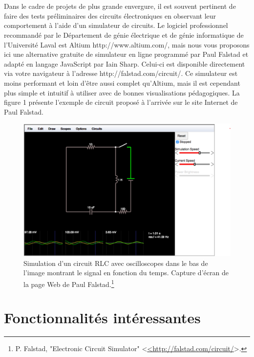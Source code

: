 \documentclass[12pt,oneside,letterpaper]{article}
\begin{document}
\title{}
\author{Claudine Allen \& Alicia Talbot-Lanciault}
\date{}
\maketitle



\section{}

Dans le cadre de projets de plus grande envergure, il est souvent pertinent de
faire des tests préliminaires des circuits électroniques en observant leur comportement
à l’aide d’un simulateur de circuits. Le logiciel professionnel recommandé par
le Département de génie électrique et de génie informatique de l’Université Laval
est Altium http://www.altium.com/, mais nous vous proposons ici une alternative
gratuite de simulateur en ligne programmé par Paul Falstad et adapté en langage
JavaScript par Iain Sharp. Celui-ci est disponible directement via votre navigateur
à l’adresse http://falstad.com/circuit/. Ce simulateur est moins performant et
loin d’être aussi complet qu’Altium, mais il est cependant plus simple et intuitif à
utiliser avec de bonnes visualisations pédagogiques. La figure 1 présente l’exemple
de circuit proposé à l’arrivée sur le site Internet de Paul Falstad.

\begin{figure}
    \centering
    \includegraphics[width=0.5\linewidth]{Labos-Complements/Falstad-simulation circuit RLC.png}
    \caption{Simulation d’un circuit RLC avec oscilloscopes dans le bas
de l’image montrant le signal en fonction du temps. Capture d’écran de
la page Web de Paul Falstad.\footnote{\label{airtable}{P. Falstad, "Electronic Circuit Simulator" <\url{<http://falstad.com/circuit/}>.}}}
    \label{Figure 1}
\end{figure}

\section{Fonctionnalités intéressantes}
\end{document}
